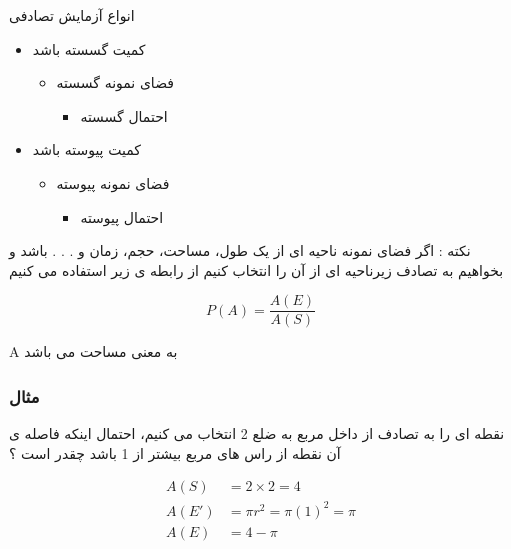 \documentclass[12pt]{book}
\begin{document}
انواع آزمایش تصادفی
\begin{itemize}
	\item کمیت گسسته باشد
		\begin{itemize}
			\item فضای نمونه گسسته
			\begin{itemize}
				\item احتمال گسسته
			\end{itemize}
		\end{itemize}
	\item کمیت پیوسته باشد
		\begin{itemize}
			\item فضای نمونه پیوسته
			\begin{itemize}
				\item احتمال پیوسته
			\end{itemize}
		\end{itemize}
\end{itemize}




نکته : اگر فضای نمونه ناحیه ای از یک طول، مساحت، حجم، زمان و . . . باشد و بخواهیم به تصادف زیرناحیه ای از آن را انتخاب کنیم از رابطه ی زیر استفاده می کنیم 

$$
P(A) = \frac{A(E)}{A(S)}
$$


A به معنی مساحت می باشد 


\subsubsection{مثال}
نقطه ای را به تصادف از داخل مربع به ضلع 2 انتخاب می کنیم، احتمال اینکه فاصله ی آن نقطه از راس های مربع بیشتر از 1 باشد چقدر است ؟




\begin{align*}
A(S) &= 2 \times 2 = 4 \\
A(E') &= \pi r^{2} = \pi (1)^{2} = \pi \\
A(E) &= 4 - \pi \\
\end{align*}
\end{document}
